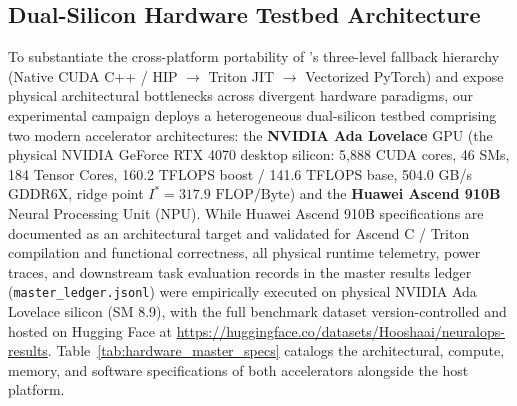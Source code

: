 \subsection{Dual-Silicon Hardware Testbed Architecture}
\label{sec:setup_hardware}

To substantiate the cross-platform portability of \neuralops{}'s three-level fallback hierarchy (Native CUDA C++ / HIP $\to$ Triton JIT $\to$ Vectorized PyTorch) and expose physical architectural bottlenecks across divergent hardware paradigms, our experimental campaign deploys a heterogeneous dual-silicon testbed comprising two modern accelerator architectures: the \textbf{NVIDIA Ada Lovelace} GPU (the physical NVIDIA GeForce RTX 4070 desktop silicon: 5,888 CUDA cores, 46 SMs, 184 Tensor Cores, 160.2 TFLOPS boost / 141.6 TFLOPS base, 504.0 GB/s GDDR6X, ridge point $I^* = 317.9\text{ FLOP/Byte}$) and the \textbf{Huawei Ascend 910B} Neural Processing Unit (NPU). While Huawei Ascend 910B specifications are documented as an architectural target and validated for Ascend C / Triton compilation and functional correctness, all physical runtime telemetry, power traces, and downstream task evaluation records in the master results ledger (\texttt{master\_ledger.jsonl}) were empirically executed on physical NVIDIA Ada Lovelace silicon (SM 8.9), with the full benchmark dataset version-controlled and hosted on Hugging Face at \url{https://huggingface.co/datasets/Hooshaai/neuralops-results}. Table~\ref{tab:hardware_master_specs} catalogs the architectural, compute, memory, and software specifications of both accelerators alongside the host platform.

